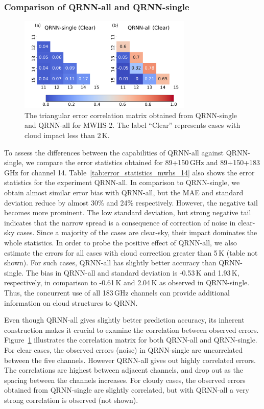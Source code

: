\documentclass[amt, manuscript]{copernicus}
\begin{document}
\subsubsection{Comparison of QRNN-all and QRNN-single}
%
\begin{figure}[t]
	\centering
	\includegraphics[height=45mm]{Figures/fig04.pdf} 
	\caption{ The triangular error correlation matrix obtained from QRNN-single and QRNN-all for MWHS-2. The label ``Clear'' represents cases with cloud impact less than 2\,K.}
	\label{fig:correlations_mwhs}	
\end{figure}
To assess the differences between the capabilities of QRNN-all against QRNN-single, we  compare the error statistics obtained for 89+150\,GHz and 89+150+183\,GHz for channel 14.  Table~\ref{tab:error_statistics_mwhs_14} also shows the error statistics for the experiment QRNN-all. In comparison to QRNN-single, we obtain almost similar error bias with QRNN-all, but the MAE and standard deviation reduce by almost 30\% and 24\% respectively. However, the negative tail becomes more prominent. The low standard deviation, but strong negative tail indicates that the narrow spread is a consequence of correction of noise in clear-sky cases. Since a majority of the cases are clear-sky, their impact dominates the whole statistics. In order to probe the positive effect of QRNN-all, we also estimate the errors for all cases with cloud correction greater than 5\,K (table not shown). For such cases,  QRNN-all has slightly better accuracy than QRNN-single.   The bias in QRNN-all and standard deviation is -0.53\,K and 1.93\,K, respectively, in comparison to -0.61\,K and 2.04\,K as observed in QRNN-single. Thus, the concurrent use of all 183\,GHz channels can provide additional information on cloud structures to QRNN. 

Even though QRNN-all gives slightly better prediction accuracy, its inherent construction makes it crucial to examine the correlation between observed errors. Figure~\ref{fig:correlations_mwhs} illustrates the correlation matrix for both QRNN-all and QRNN-single. For clear cases, the observed errors (noise) in QRNN-single are uncorrelated between the five channels. However QRNN-all gives out highly correlated errors. The correlations are highest between adjacent channels, and drop out as the spacing between the channels increases. For cloudy cases, the observed errors obtained from QRNN-single are slightly correlated, but with QRNN-all a very strong correlation is observed (not shown). 
\end{document}
